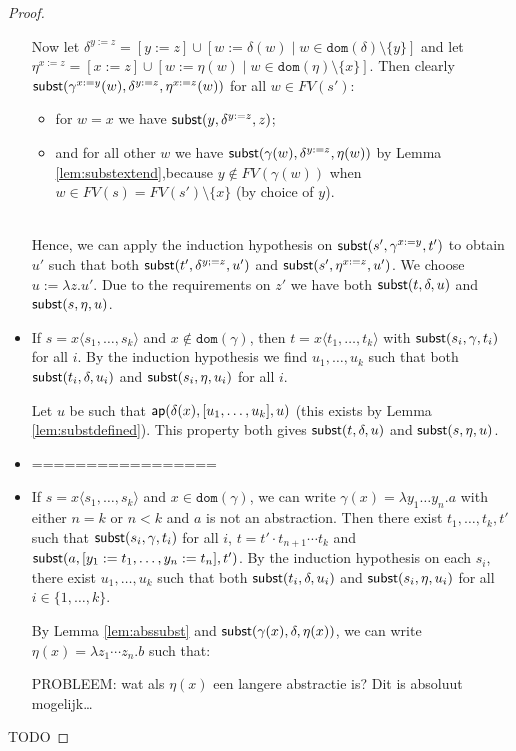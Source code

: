 \documentclass{lmcs}
\theoremstyle{theorem}\newtheorem{theorem}{Theorem}
\theoremstyle{theorem}\newtheorem{lemma}[theorem]{Lemma}
\theoremstyle{theorem}\newtheorem{corollary}[theorem]{Corollary}
\theoremstyle{definition}\newtheorem{definition}[theorem]{Definition}
\theoremstyle{definition}\newtheorem{example}[theorem]{Example}
\newcommand{\FV}{\mathit{FV}}
\newcommand{\domain}{\mathtt{dom}}
\newcommand{\avar}{x}
\newcommand{\bvar}{y}
\newcommand{\cvar}{z}
\newcommand{\abs}[2]{\lambda #1.#2}
\newcommand{\meta}[2]{#1\langle#2\rangle}
\begin{document}
\begin{proof}
\begin{itemize}
  Now let $\delta^{\bvar:=\cvar} = [\bvar:=\cvar] \cup [w:=\delta(w) \mid w \in \domain(\delta)
  \setminus \{\bvar\}]$ and let $\eta^{\avar:=\cvar} = [\avar:=\cvar] \cup [w:=\eta(w) \mid w \in
  \domain(\eta) \setminus \{\avar\}]$.  Then clearly $\subrel{\gamma^{\avar:=\bvar}(w),\delta^{
  \bvar:=\cvar},\eta^{\avar:=\cvar}(w)}$ for all $w \in \FV(s')$:
  \begin{itemize}
  \item for $w = \avar$ we have $\subrel{\bvar,\delta^{\bvar:=\cvar},\cvar}$;
  \item and for all other $w$ we have $\subrel{\gamma(w),\delta^{\bvar:=\cvar},\eta(w)}$ by Lemma
    \ref{lem:substextend},because $\bvar \notin \FV(\gamma(w))$ when $w \in \FV(s) = \FV(s')
    \setminus \{\avar\}$ (by choice of $\bvar$).
  \end{itemize}
  \ \\
  Hence, we can apply the induction hypothesis on $\subrel{s',\gamma^{\avar:=\bvar},t'}$ to obtain
  $u'$ such that both $\subrel{t',\delta^{\bvar;=\cvar},u'}$ and $\subrel{s',\eta^{\avar:=\cvar},
  u'}$.  We choose $u := \abs{\cvar}{u'}$.  Due to the requirements on $\cvar'$ we have both
  $\mathsf{subst}(t,\delta,u)$ and $\mathsf{subst}(s,\eta,u)$.
\item If $s = \meta{\avar}{s_1,\dots,s_k}$ and $\avar \notin \domain(\gamma)$, then
  $t = \meta{\avar}{t_1,\dots,t_k}$ with $\mathsf{subst}(s_i,\gamma,t_i)$ for all $i$.  By the induction
  hypothesis we find $u_1,\dots,u_k$ such that both $\mathsf{subst}(t_i,\delta,u_i)$ and $\mathsf{subst}(s_i,
  \eta,u_i)$ for all $i$.

  Let $u$ be such that $\aprel{\delta(\avar),[u_1,\dots,u_k],u}$ (this exists by Lemma
  \ref{lem:substdefined}).  This property both gives $\mathsf{subst}(t,\delta,u)$ and $\mathsf{subst}(s,\eta,u)$.
\item =================
\item If $s = \meta{\avar}{s_1,\dots,s_k}$ and $\avar \in \domain(\gamma)$, we can write
  $\gamma(\avar) = \abs{\bvar_1 \dots \bvar_n}{a}$ with either $n = k$ or $n < k$ and $a$ is not an
  abstraction.
  Then there exist $t_1,\dots,t_k,t'$ such that $\mathsf{subst}(s_i,\gamma,t_i)$ for all $i$,
  $t = t' \cdot t_{n+1} \cdots t_k$ and $\subrel{a,[\bvar_1:=t_1,\dots,\bvar_n:=t_n],t'}$.
  By the induction hypothesis on each $s_i$, there exist $u_1,\dots,u_k$ such that both
  $\mathsf{subst}(t_i,\delta,u_i)$ and $\mathsf{subst}(s_i,\eta,u_i)$ for all $i \in \{1,\dots,k\}$.

  By Lemma \ref{lem:abssubst} and $\subrel{\gamma(\avar),\delta,\eta(\avar)}$, we can write
  $\eta(\avar) = \abs{\cvar_1 \cdots \cvar_n}{b}$ such that:

  PROBLEEM: wat als $\eta(\avar)$ een langere abstractie is?  Dit is absoluut mogelijk\dots
\end{itemize}

TODO
\end{proof}
\end{document}
